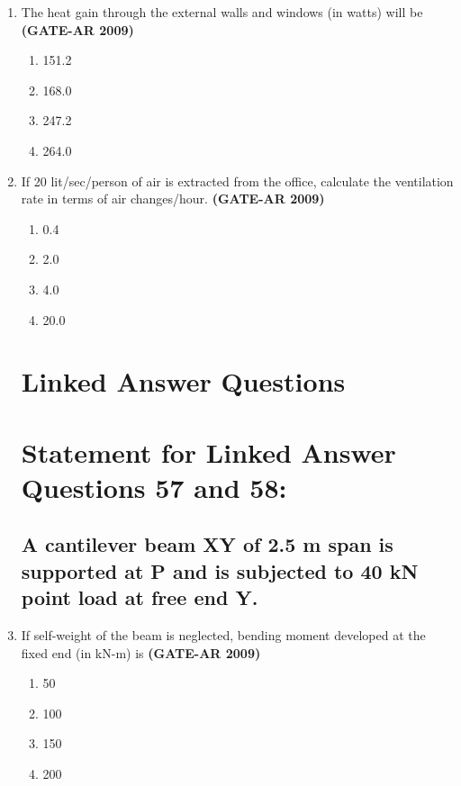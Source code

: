 \documentclass[a4paper,10pt]{article}
\begin{document}
\begin{enumerate}
    \item The heat gain through the external walls and windows (in watts) will be \hfill \textbf{(GATE-AR 2009)}
    \begin{multicols}{4}
	\begin{enumerate}
        \item 151.2
        \item 168.0
        \item 247.2
        \item 264.0
    \end{enumerate}
	\end{multicols}

    \item If 20 lit/sec/person of air is extracted from the office, calculate the ventilation rate in terms of air changes/hour. \hfill \textbf{(GATE-AR 2009)}
    \begin{multicols}{4}
	\begin{enumerate}
        \item 0.4
        \item 2.0
        \item 4.0
        \item 20.0
    \end{enumerate}
	\end{multicols}

\section*{Linked Answer Questions}

\section*{Statement for Linked Answer Questions 57 and 58:}
\subsection*{A cantilever beam XY of 2.5 m span is supported at P and is subjected to 40 kN point load at free end Y.}

    \item If self-weight of the beam is neglected, bending moment developed at the fixed end (in kN-m) is \hfill \textbf{(GATE-AR 2009)}
    \begin{multicols}{4}
	\begin{enumerate}
        \item 50
        \item 100
        \item 150
        \item 200
    \end{enumerate}
	\end{multicols}


\end{enumerate}
\end{document}
